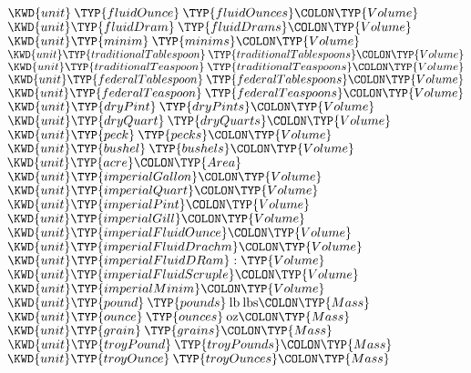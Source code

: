 \begin{Fortress}
\( \KWD{unit}\mskip 4mu plus 4mu\TYP{fluidOunce}\mskip 4mu plus 4mu\TYP{fluidOunces}\COLON \TYP{Volume} \)\\
\( \KWD{unit} \TYP{fluidDram}\mskip 4mu plus 4mu\TYP{fluidDrams}\COLON \TYP{Volume}\)\\
\( \KWD{unit} \TYP{minim}\mskip 4mu plus 4mu\TYP{minims}\COLON \TYP{Volume} \)\\[4pt]
\( \KWD{unit} \TYP{traditionalTablespoon}\mskip 4mu plus 4mu\TYP{traditionalTablespoons}\COLON \TYP{Volume} \)\\
\( \KWD{unit} \TYP{traditionalTeaspoon}\mskip 4mu plus 4mu\TYP{traditionalTeaspoons}\COLON \TYP{Volume} \)\\
\( \KWD{unit} \TYP{federalTablespoon}\mskip 4mu plus 4mu\TYP{federalTablespoons}\COLON \TYP{Volume} \)\\
\( \KWD{unit} \TYP{federalTeaspoon}\mskip 4mu plus 4mu\TYP{federalTeaspoons}\COLON \TYP{Volume} \)\\[4pt]
\( \KWD{unit} \TYP{dryPint}\mskip 4mu plus 4mu\TYP{dryPints}\COLON \TYP{Volume} \)\\
\( \KWD{unit} \TYP{dryQuart}\mskip 4mu plus 4mu\TYP{dryQuarts}\COLON \TYP{Volume} \)\\
\( \KWD{unit} \TYP{peck}\mskip 4mu plus 4mu\TYP{pecks}\COLON \TYP{Volume} \)\\
\( \KWD{unit} \TYP{bushel}\mskip 4mu plus 4mu\TYP{bushels}\COLON \TYP{Volume} \)\\[4pt]
\( \KWD{unit} \TYP{acre}\COLON \TYP{Area} \)\\[4pt]
\( \KWD{unit} \TYP{imperialGallon}\COLON \TYP{Volume} \)\\
\( \KWD{unit} \TYP{imperialQuart}\COLON \TYP{Volume} \)\\
\( \KWD{unit} \TYP{imperialPint}\COLON \TYP{Volume} \)\\
\( \KWD{unit} \TYP{imperialGill}\COLON \TYP{Volume} \)\\
\( \KWD{unit} \TYP{imperialFluidOunce}\COLON \TYP{Volume} \)\\
\( \KWD{unit} \TYP{imperialFluidDrachm}\COLON \TYP{Volume} \)\\
\( \KWD{unit} \TYP{imperialFluidDRam} \mathrel{\mathtt{:}} \TYP{Volume} \)\\
\( \KWD{unit} \TYP{imperialFluidScruple}\COLON \TYP{Volume} \)\\
\( \KWD{unit} \TYP{imperialMinim}\COLON \TYP{Volume} \)\\[4pt]
\( \KWD{unit} \TYP{pound}\mskip 4mu plus 4mu\TYP{pounds}\mskip 4mu plus 4mu\mathrm{lb}\mskip 4mu plus 4mu\mathrm{lbs}\COLON \TYP{Mass} \)\\
\( \KWD{unit} \TYP{ounce}\mskip 4mu plus 4mu\TYP{ounces}\mskip 4mu plus 4mu\mathrm{oz}\COLON \TYP{Mass} \)\\
\( \KWD{unit} \TYP{grain}\mskip 4mu plus 4mu\TYP{grains}\COLON \TYP{Mass} \)\\
\( \KWD{unit} \TYP{troyPound}\mskip 4mu plus 4mu\TYP{troyPounds}\COLON \TYP{Mass} \)\\
\( \KWD{unit} \TYP{troyOunce}\mskip 4mu plus 4mu\TYP{troyOunces}\COLON \TYP{Mass} \)\-\\\poptabs
\end{Fortress}

